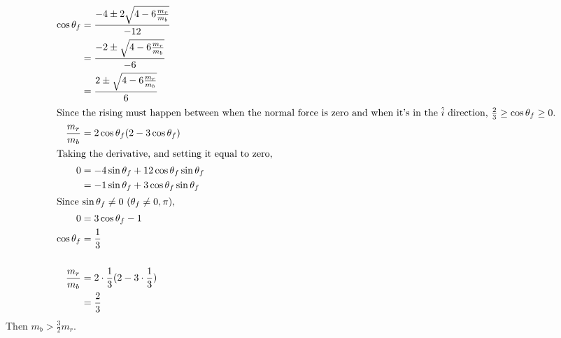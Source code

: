 \documentclass{esg8012pset}
\renewcommand{\d}{\,d}
\begin{document}
\begin{solution}
\begin{enumerate}[a)]
\begin{align*}
    \cos\theta_f & = \frac{-4 \pm 2\sqrt{4-6\frac{m_r}{m_b}}}{-12} \\
     & = \frac{-2 \pm \sqrt{4-6\frac{m_r}{m_b}}}{-6} \\
     & = \frac{2 \pm \sqrt{4-6\frac{m_r}{m_b}}}{6} \\
\intertext{Since the rising must happen between when the normal force is zero and when it's in the $\hat i$ direction, $\frac{2}{3} \geq \cos\theta_f \geq 0$.}
    \frac{m_r}{m_b} & = 2\cos\theta_f(2 - 3\cos\theta_f) \\
\intertext{Taking the derivative, and setting it equal to zero,}
    0 & = -4\sin\theta_f + 12\cos\theta_f\sin\theta_f \\
      & = -1\sin\theta_f + 3\cos\theta_f\sin\theta_f \\
\intertext{Since $\sin\theta_f \neq 0$ ($\theta_f\neq 0, \pi$),}
    0 & = 3\cos\theta_f - 1 \\
    \cos\theta_f & = \frac{1}{3} \\
    \\
    \frac{m_r}{m_b} & = 2\cdot\frac{1}{3}(2 - 3\cdot\frac{1}{3}) \\
     & = \frac{2}{3} \\
   \end{align*}
   Then $m_b > \frac{3}{2}m_r$.

\end{enumerate}
\end{solution}
\end{document}
